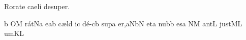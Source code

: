 %


\beginhymn Rorate caeli desuper.



\Internote
\nosolesmescustos
\initiumgregorianum
\znotes\fissum{1pt}\bmolle b\en
{}%
\sgn {}O{}\punctum M\egn
\sgn r{\'a}{t}\pes Na\egn
\sgn {}e{}\punctum a\augmentum b\egn
\spatium
\begingroup
\bgenerale
\sgn c{\ae}{l}\engl{}\punctum d\egn
\sgn {}i{}\punctum c\egn
\spatium
\sgn d{\'e}{-}\clivis cb\egn
\sgn su{p}\punctum a\egn
\sgn {}e{r,}\clivis aN\augmentumduplex bN\egn
\spatium
\divisiominor
\spatium
\sgn {}et\punctum a\egn
\spatium
\sgn n{u}b\punctum b\egn
\sgn {}es\punctum a\egn
\spatium
{}\clivis NM\egn
\sgn {}a{nt}\punctum L\egn
\spatium
\sgn j{u}{st}\clivis ML\egn
\sgn {}um\punctum K\augmentum L\egn
\spatium
\endgroup
\Finisgregoriana

\bigskip


